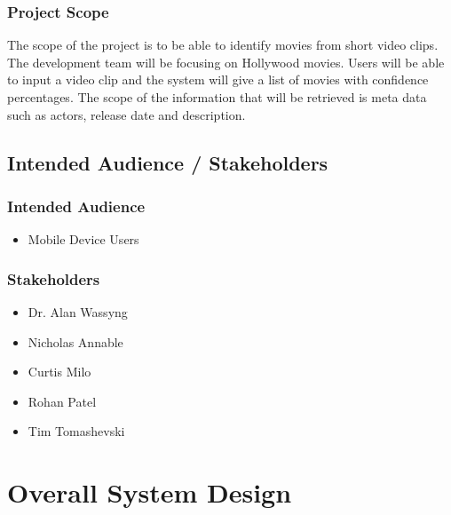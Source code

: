 \documentclass[titlepage]{article}
\begin{document}
\subsubsection{Project Scope}
The scope of the project is to be able to identify movies from short video clips. The development team will be focusing on Hollywood movies. Users will be able to input a video clip and the system will give a list of movies with confidence percentages. The scope of the information that will be retrieved is meta data such as actors, release date and description.

\subsection{Intended Audience / Stakeholders}

\subsubsection{Intended Audience}
\begin{itemize}
    \item Mobile Device Users
\end{itemize}

\subsubsection{Stakeholders}
\begin{itemize}
    \item Dr. Alan Wassyng
    \item Nicholas Annable
    \item Curtis Milo
    \item Rohan Patel
    \item Tim Tomashevski
\end{itemize}


\newpage
\section{Overall System Design}
\end{document}
